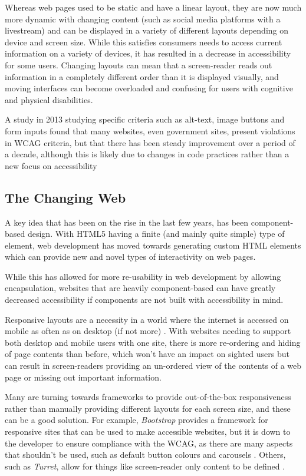 \documentclass[ %
                    author={Aleena Baig},
                supervisor={Dr Simon Lock},
                    degree={BSc},
                     title={On Making Web Accessible Graphs},
                  subtitle={},
                      year={2019} ]{dissertation}
\begin{document}
Whereas web pages used to be static and have a linear layout, they are now much more dynamic with changing content (such as social media platforms with a livestream) and can be displayed in a variety of different layouts depending on device and screen size. While this satisfies consumers needs to access current information on a variety of devices, it has resulted in a decrease in accessibility for some users. Changing layouts can mean that a screen-reader reads out information in a completely different order than it is displayed visually, and moving interfaces can become overloaded and confusing for users with cognitive and physical disabilities.

A study in 2013 studying specific criteria such as alt-text, image buttons and form inputs found that many websites, even government sites, present violations in WCAG criteria, but that there has been steady improvement over a period of a decade, although this is likely due to changes in code practices rather than a new focus on accessibility \cite{progressaccessibility}

\subsection{The Changing Web}

A key idea that has been on the rise in the last few years, has been component-based design. With HTML5 having a finite (and mainly quite simple) type of element, web development has moved towards generating custom HTML elements which can provide new and novel types of interactivity on web pages.

While this has allowed for more re-usability in web development by allowing encapsulation, websites that are heavily component-based can have greatly decreased accessibility if components are not built with accessibility in mind.

Responsive layouts are a necessity in a world where the internet is accessed on mobile as often as on desktop (if not more) \cite{mobileusestudy}. With websites needing to support both desktop and mobile users with one site, there is more re-ordering and hiding of page contents than before, which won't have an impact on sighted users but can result in screen-readers providing an un-ordered view of the contents of a web page or missing out important information.

Many are turning towards frameworks to provide out-of-the-box responsiveness rather than manually providing different layouts for each screen size, and these can be a good solution. For example, \textit{Bootstrap} provides a framework for responsive sites that can be used to make accessible websites, but it is down to the developer to ensure compliance with the WCAG, as there are many aspects that shouldn't be used, such as default button colours and carousels \cite{bootstrapaccessibility}. Others, such as \textit{Turret}, allow for things like screen-reader only content to be defined \cite{turretaccessibility}.
\end{document}
